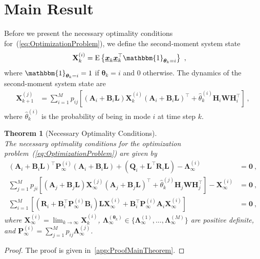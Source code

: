 \documentclass[preprint,1p,11pt]{IR-Template/ISAS_IR}
\newcommand{\rv}[1]{\ensuremath{{\boldsymbol{#1}}}}
\newcommand{\rvec}[1]{\ensuremath{{\boldsymbol{\underline{#1}}}}}
\newcommand{\mat}[1]{{\ensuremath{{\mathbf{#1}}}}}
\newcommand{\tr}{^{\top}}
\newcommand{\expect}[1]{\mathrm{E}\left\lbrace #1 \right\rbrace}
\newcommand{\zeromatrix}{\mat{0}}
\newcommand{\bklammer}[1]{\left[ #1 \right]}
\newcommand{\indicator}[1]{\mathbbm{1}_{#1}}
\newcommand{\Asys}[1]{\mat{A}_{#1}}
\newcommand{\Bsys}[1]{\mat{B}_{#1}}
\newcommand{\Qsys}[1]{\mat{Q}_{#1}}
\newcommand{\Rsys}[1]{\mat{R}_{#1}}
\newcommand{\Hsys}[1]{\mat{H}_{#1}}
\newcommand{\xsys}[1]{\rvec{x}_{#1}}
\newcommand{\wCov}{\mat{W}}
\newcommand{\mode}[1]{\rv{\theta}_{#1}}
\newcommand{\modeest}[2]{\widehat{\theta}^{(#1)}_{#2}}
\newcommand{\transitionprob}[1]{p_{#1}}
\newcommand{\Xsysest}[2]{\mat{X}^{(#1)}_{#2}}
\newcommand{\ControlLaw}{\mat{L}}
\newcommand{\NumModes}{M}
\newcommand{\Pest}[2]{\mat{P}^{(#1)}_{#2}}
\newcommand{\Lagrange}[2]{\mat{\Lambda}^{(#1)}_{#2}}
\newtheorem{theorem}{Theorem}
\newtheorem{proof}{Proof}
\begin{document}
   \section{Main Result}
   	\label{sec:MainResult}
   	Before we present the necessary optimality conditions for~(\ref{eq:OptimizationProblem}), we define the second-moment system state
\begin{align*}
\Xsysest{i}{k}
	&=
	\expect{\xsys{k}\xsys{k}\tr\indicator{\mode{k}=i}}\ ,
\end{align*}
where $\indicator{\mode{k}=i}=1$ if $\mode{k}=i$ and $0$ otherwise. The dynamics of the second-moment system state are
\begin{align}
\Xsysest{j}{k+1}
	&=
	\sum\limits_{i=1}^{\NumModes}\transitionprob{ij}\bklammer{(\Asys{i}+\Bsys{i}\ControlLaw)\Xsysest{i}{k}(\Asys{i}+\Bsys{i}\ControlLaw)\tr + \modeest{i}{k}\Hsys{i}\wCov\Hsys{i}\tr}\ ,
\label{eq:SecondMomentDynamics}
\end{align}
where $\modeest{i}{k}$ is the probability of being in mode $i$ at time step $k$.
\begin{theorem}[Necessary Optimality Conditions]\hfill\\
The necessary optimality conditions for the optimization problem~(\ref{eq:OptimizationProblem}) are given by
\begin{align}
	(\Asys{i}+\Bsys{i}\ControlLaw)\tr \Pest{i}{\infty} (\Asys{i}+\Bsys{i}\ControlLaw) + (\Qsys{i}+\ControlLaw\tr\Rsys{i}\ControlLaw) - \Lagrange{i}{\infty} &= \zeromatrix\ ,
\label{eq:CoupledEquationsP}\\
	\sum\limits_{j=1}^{\NumModes}\transitionprob{ji}\bklammer{(\Asys{j}+\Bsys{j}\ControlLaw)\Xsysest{j}{\infty}(\Asys{j}+\Bsys{j}\ControlLaw)\tr + \modeest{j}{k}\Hsys{j}\wCov\Hsys{j}\tr} - \Xsysest{i}{\infty} &= \zeromatrix\ ,
\label{eq:CoupledEquationsExx}\\
	\sum\limits_{i=1}^{\NumModes} \bklammer{(\Rsys{i}+\Bsys{i}\tr\Pest{i}{\infty}\Bsys{i})\ControlLaw\Xsysest{i}{\infty} + \Bsys{i}\tr\Pest{i}{\infty}\Asys{i}\Xsysest{i}{\infty}} &= \zeromatrix\ ,
\label{eq:CoupledEquationsL}
\end{align}
where $\Xsysest{i}{\infty} = \lim_{k\rightarrow\infty}\Xsysest{i}{k}$, $\Lagrange{\mode{k}}{\infty}\in\{\Lagrange{1}{\infty},\dots,\Lagrange{\NumModes}{\infty}\}$ are positive definite, and $\Pest{i}{\infty} = \sum_{j=1}^{\NumModes}\transitionprob{ij}\Lagrange{j}{\infty}$.
\label{theor:Main}
\end{theorem}
\begin{proof}
The proof is given in~\ref{app:ProofMainTheorem}.
\end{proof}
\end{document}
